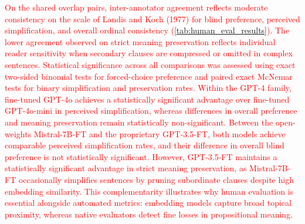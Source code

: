 \textcolor{red}{On the shared overlap pairs, inter-annotator agreement reflects moderate consistency on the scale of Landis and Koch (1977) for blind preference, perceived simplification, and overall ordinal consistency (\autoref{tab:human_eval_results}). The lower agreement observed on strict meaning preservation reflects individual reader sensitivity when secondary clauses are compressed or omitted in complex sentences. Statistical significance across all comparisons was assessed using exact two-sided binomial tests for forced-choice preference and paired exact McNemar tests for binary simplification and preservation rates. Within the GPT-4 family, fine-tuned GPT-4o achieves a statistically significant advantage over fine-tuned GPT-4o-mini in perceived simplification, whereas differences in overall preference and meaning preservation remain statistically non-significant. Between the open-weights Mistral-7B-FT and the proprietary GPT-3.5-FT, both models achieve comparable perceived simplification rates, and their difference in overall blind preference is not statistically significant. However, GPT-3.5-FT maintains a statistically significant advantage in strict meaning preservation, as Mistral-7B-FT occasionally simplifies sentences by pruning subordinate clauses despite high embedding similarity. This complementarity illustrates why human evaluation is essential alongside automated metrics: embedding models capture broad topical proximity, whereas native evaluators detect fine losses in propositional meaning.}
